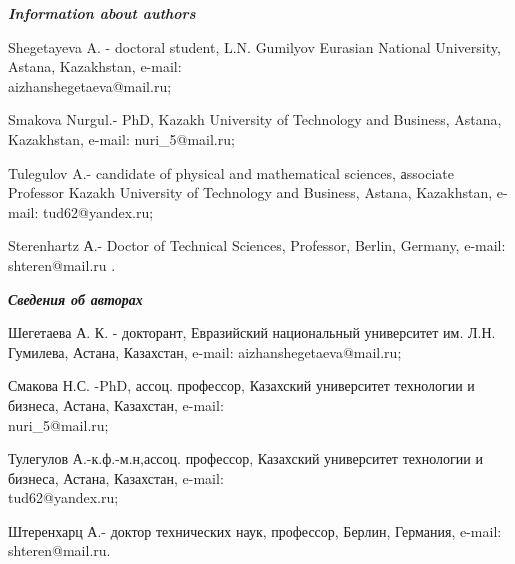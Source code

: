 \begin{authorinfo}
\emph{{\bfseries Information about authors}}

Shegetayeva A. - doctoral student, L.N. Gumilyov Eurasian National
University, Astana, Kazakhstan, e-mail:\\
aizhanshegetaeva@mail.ru;

Smakova Nurgul.- PhD, Kazakh University of Technology and Business,
Astana, Kazakhstan, e-mail:
nuri\_5@mail.ru;

Tulegulov A.- candidate of physical and mathematical sciences, аssociate
Professor Kazakh University of Technology and Business, Astana,
Kazakhstan, e-mail:
tud62@yandex.ru;

Sterenhartz А.- Doctor of Technical Sciences, Professor, Berlin,
Germany, e-mail: shteren@mail.ru .

\emph{{\bfseries Сведения об авторах}}

Шегетаева А. К. - докторант, Евразийский национальный университет им.
Л.Н. Гумилева, Астана, Казахстан, e-mail:
aizhanshegetaeva@mail.ru;

Смакова Н.С. -PhD, ассоц. профессор, Казахский университет технологии и
бизнеса, Астана, Казахстан, e-mail:\\
nuri\_5@mail.ru;

Тулегулов А.-к.ф.-м.н,ассоц. профессор, Казахский университет технологии
и бизнеса, Астана, Казахстан, e-mail:\\
tud62@yandex.ru;

Штеренхарц А.- доктор технических наук, профессор, Берлин, Германия,
e-mail: shteren@mail.ru.
\end{authorinfo}
